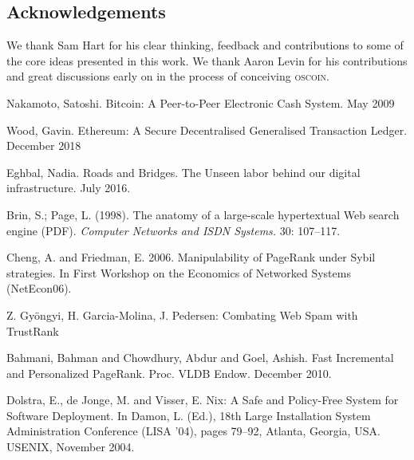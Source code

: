 \documentclass[a4paper, oneside, 10pt, final]{amsart}
\def\oscoin{\textsc{\small{oscoin}}}
\begin{document}
\setlength{\columnsep}{1cm}
\begin{multicols}{2}






\pagebreak


\section*{Acknowledgements}
We thank Sam Hart for his clear thinking, feedback and contributions to some of
the core ideas presented in this work. We thank Aaron Levin for his contributions
and great discussions early on in the process of conceiving \oscoin{}.

\begin{thebibliography}{9}

 Nakamoto, Satoshi. Bitcoin: A Peer-to-Peer Electronic Cash
  System. May 2009

 Wood, Gavin. Ethereum: A Secure Decentralised Generalised
  Transaction Ledger. December 2018

 Eghbal, Nadia. Roads and Bridges. The Unseen labor
  behind our digital infrastructure. July 2016.

 Brin, S.; Page, L. (1998). The anatomy of a
  large-scale hypertextual Web search engine (PDF). \emph{Computer Networks
  and ISDN Systems.} 30: 107–117.

 Cheng, A. and Friedman, E. 2006. Manipulability of
  PageRank under Sybil strategies. In First Workshop on the Economics of
  Networked Systems (NetEcon06).

 Z. Gyöngyi, H. Garcia-Molina, J. Pedersen: Combating Web
  Spam with TrustRank

 Bahmani, Bahman and Chowdhury, Abdur and Goel,
  Ashish. Fast Incremental and Personalized PageRank. Proc. VLDB
  Endow. December 2010.

 Dolstra, E., de Jonge, M. and Visser, E. Nix: A Safe and
  Policy-Free System for Software Deployment. In Damon, L. (Ed.), 18th Large
  Installation System Administration Conference (LISA '04), pages 79–92, Atlanta,
  Georgia, USA. USENIX, November 2004.

\end{thebibliography}

\end{multicols}
\end{document}
